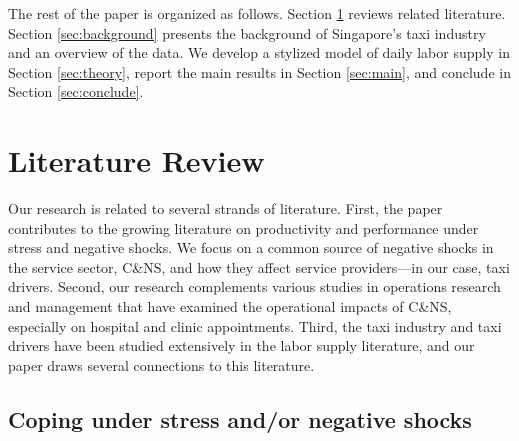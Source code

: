 \documentclass[reviewmode]{restat}
\begin{document}
The rest of the paper is organized as follows. Section \ref{sec:literature} reviews related literature. 
Section \ref{sec:background} presents the background of Singapore's taxi industry and an overview of the data. 
We develop a stylized model of daily labor supply in Section \ref{sec:theory}, 
report the main results in Section \ref{sec:main}, and conclude in Section \ref{sec:conclude}.

\section{Literature Review}
\label{sec:literature}

Our research is related to several strands of literature. First, the paper contributes to the growing 
literature on productivity and performance under stress and negative shocks. We focus on a common 
source of negative shocks in the service sector, C\&NS, and how they affect service providers---in our
case, taxi drivers. Second, our research complements various studies in operations research and 
management that have examined the operational impacts of C\&NS, especially on hospital and clinic 
appointments. Third, the taxi industry and taxi drivers  have been studied extensively in the labor
supply literature, and our paper draws several connections to this literature.  


\subsection{Coping under stress and/or negative shocks}
\end{document}
